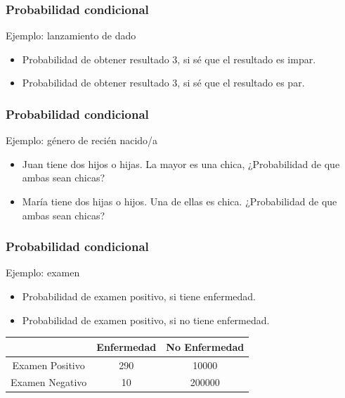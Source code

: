 \documentclass[table]{beamer}
\begin{document}
\begin{frame}
    \frametitle{Probabilidad condicional}
    \begin{exampleblock}{Ejemplo: lanzamiento de dado}
        \begin{itemize}
            \item Probabilidad de obtener resultado 3, si sé que el resultado es impar.
            \item Probabilidad de obtener resultado 3, si sé que el resultado es par.
        \end{itemize}
    \end{exampleblock}
\end{frame}
\fi



\begin{frame}
    \frametitle{Probabilidad condicional}
    \begin{exampleblock}{Ejemplo: g\'enero de reci\'en nacido/a}
        \begin{itemize}
            \item Juan tiene dos hijos o hijas. La mayor es una chica, ¿Probabilidad de que ambas sean chicas?
            \item Mar\'ia tiene dos hijas o hijos. Una de ellas es chica. ¿Probabilidad de que ambas sean chicas?
        \end{itemize}
    \end{exampleblock}
\end{frame}

\begin{frame}
    \frametitle{Probabilidad condicional}
    \begin{block}{Ejemplo: examen}
        \begin{itemize}
            \item Probabilidad de examen positivo, si tiene enfermedad.
            \item Probabilidad de examen positivo, si no tiene enfermedad.
        \end{itemize}
    \end{block}
    \begin{center}
        \begin{tabular}{c|cc}
            & Enfermedad & No Enfermedad \\
            \hline
            Examen Positivo & 290 & 10000 \\
            Examen Negativo & 10 & 200000 \\
        \end{tabular}
    \end{center}
\end{frame}
\end{document}

